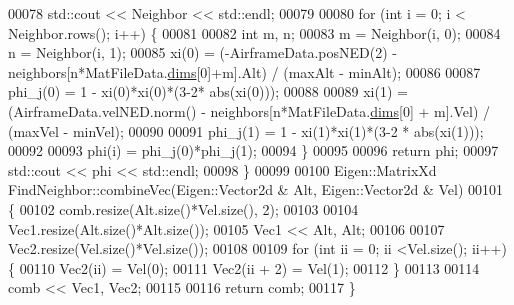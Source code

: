 \begin{DoxyCode}
00078     std::cout << Neighbor << std::endl;
00079     
00080     \textcolor{keywordflow}{for} (\textcolor{keywordtype}{int} i = 0; i < Neighbor.rows(); i++) \{
00081 
00082         \textcolor{keywordtype}{int} m, n;
00083         m = Neighbor(i, 0);
00084         n = Neighbor(i, 1);
00085         xi(0) = (-AirframeData.posNED(2) - neighbors[n*MatFileData.\hyperlink{group___m_a_t_a8e01234e1c862ce3472bb37f5a09b92c}{dims}[0]+m].Alt) / (maxAlt - minAlt);
00086 
00087         phi\_j(0) = 1 - xi(0)*xi(0)*(3-2* abs(xi(0)));
00088 
00089         xi(1) = (AirframeData.velNED.norm() - neighbors[n*MatFileData.\hyperlink{group___m_a_t_a8e01234e1c862ce3472bb37f5a09b92c}{dims}[0] + m].Vel) / (maxVel - 
      minVel);
00090 
00091         phi\_j(1) = 1 - xi(1)*xi(1)*(3-2 * abs(xi(1)));
00092 
00093         phi(i) = phi\_j(0)*phi\_j(1);
00094     \}
00095 
00096     \textcolor{keywordflow}{return} phi;
00097     std::cout << phi << std::endl;
00098 \}
00099 
00100 Eigen::MatrixXd FindNeighbor::combineVec(Eigen::Vector2d & Alt, Eigen::Vector2d & Vel)
00101 \{
00102     comb.resize(Alt.size()*Vel.size(), 2);
00103     
00104     Vec1.resize(Alt.size()*Alt.size());
00105     Vec1 << Alt, Alt;
00106 
00107     Vec2.resize(Vel.size()*Vel.size());
00108 
00109     \textcolor{keywordflow}{for} (\textcolor{keywordtype}{int} ii = 0; ii <Vel.size(); ii++) \{
00110         Vec2(ii) = Vel(0);
00111         Vec2(ii + 2) = Vel(1);
00112     \}
00113 
00114     comb << Vec1, Vec2;
00115     
00116     \textcolor{keywordflow}{return} comb;
00117 \}
\end{DoxyCode}
